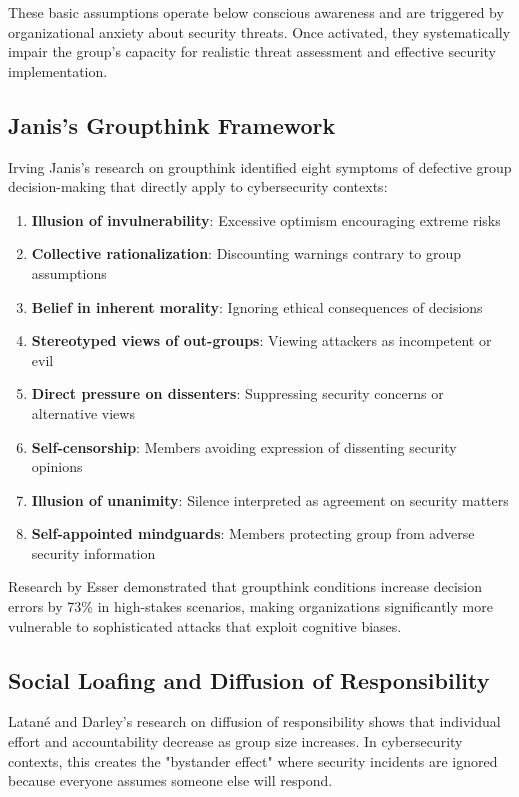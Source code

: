 \documentclass[11pt,a4paper]{article}
\begin{document}
These basic assumptions operate below conscious awareness and are triggered by organizational anxiety about security threats. Once activated, they systematically impair the group's capacity for realistic threat assessment and effective security implementation.

\subsection{Janis's Groupthink Framework}

Irving Janis's research on groupthink \cite{janis1972} identified eight symptoms of defective group decision-making that directly apply to cybersecurity contexts:

\begin{enumerate}
\item \textbf{Illusion of invulnerability}: Excessive optimism encouraging extreme risks
\item \textbf{Collective rationalization}: Discounting warnings contrary to group assumptions
\item \textbf{Belief in inherent morality}: Ignoring ethical consequences of decisions
\item \textbf{Stereotyped views of out-groups}: Viewing attackers as incompetent or evil
\item \textbf{Direct pressure on dissenters}: Suppressing security concerns or alternative views
\item \textbf{Self-censorship}: Members avoiding expression of dissenting security opinions
\item \textbf{Illusion of unanimity}: Silence interpreted as agreement on security matters
\item \textbf{Self-appointed mindguards}: Members protecting group from adverse security information
\end{enumerate}

Research by Esser \cite{esser1998} demonstrated that groupthink conditions increase decision errors by 73\% in high-stakes scenarios, making organizations significantly more vulnerable to sophisticated attacks that exploit cognitive biases.

\subsection{Social Loafing and Diffusion of Responsibility}

Latané and Darley's research \cite{latane1970} on diffusion of responsibility shows that individual effort and accountability decrease as group size increases. In cybersecurity contexts, this creates the "bystander effect" where security incidents are ignored because everyone assumes someone else will respond.
\end{document}
